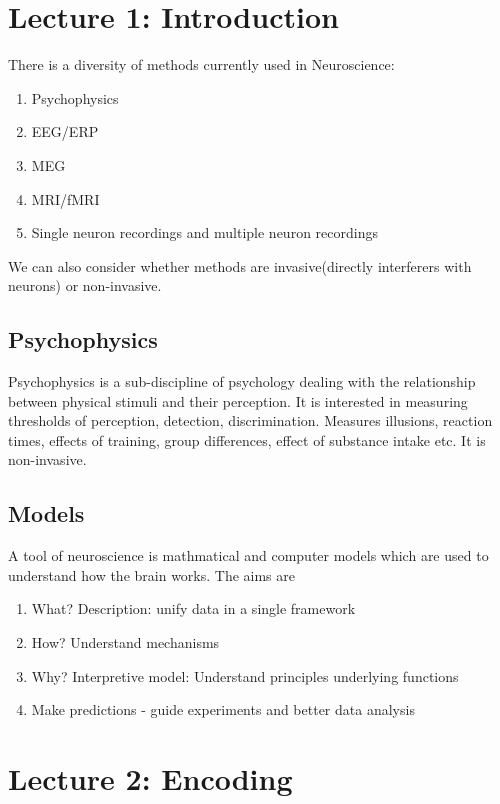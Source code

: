 \documentclass[11pt]{article}
\begin{document}
\section{Lecture 1: Introduction}

There is a diversity of methods currently used in Neuroscience:

\begin{enumerate}
\item Psychophysics
\item EEG/ERP
\item MEG
\item MRI/fMRI
\item Single neuron recordings and multiple neuron recordings
\end{enumerate}

We can also consider whether methods are invasive(directly interferers with neurons\cite{check}) or non-invasive. 

\subsection*{Psychophysics}
Psychophysics is a sub-discipline of psychology dealing with the relationship between physical stimuli and their perception. It is interested in measuring thresholds of perception, detection, discrimination. Measures illusions, reaction times, effects of training, group differences, effect of substance intake etc. It is non-invasive.  

\subsection*{Models}
A tool of neuroscience is mathmatical and computer models which are used to understand how the brain works. The aims are 

\begin{enumerate}
\item What? Description: unify data in a single framework
\item How? Understand mechanisms
\item Why? Interpretive model: Understand principles underlying functions
\item Make predictions - guide experiments and better data analysis
\end{enumerate}

\section{Lecture 2: Encoding}
\end{document}
